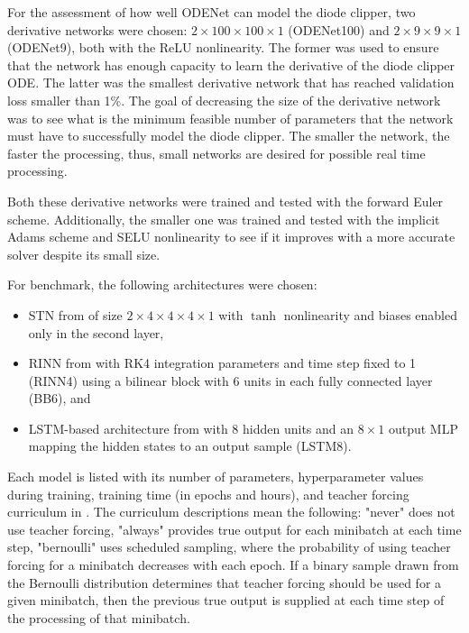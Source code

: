For the assessment of how well ODENet can model the diode clipper, two derivative networks were chosen: $2 \times 100 \times 100 \times 1$ (ODENet100) and $2 \times 9 \times 9 \times 1$ (ODENet9), both with the \ac{ReLU} nonlinearity. The former was used to ensure that the network has enough capacity to learn the derivative of the diode clipper \ac{ODE}. The latter was the smallest derivative network that has reached validation loss smaller than 1\%. The goal of decreasing the size of the derivative network was to see what is the minimum feasible number of parameters that the network must have to successfully model the diode clipper. The smaller the network, the faster the processing, thus, small networks are desired for possible real time processing.

Both these derivative networks were trained and tested with the forward Euler scheme. Additionally, the smaller one was trained and tested with the implicit Adams scheme and \ac{SELU} nonlinearity to see if it improves with a more accurate solver despite its small size.

For benchmark, the following architectures were chosen:
\begin{itemize}
    \item \ac{STN} from \cite{Parker2019} of size $2 \times 4 \times 4 \times 4 \times 1$ with $\tanh$ nonlinearity and biases enabled only in the second layer, 
    \item \ac{RINN} from \cite{Ouala2019} with \ac{RK}4 integration parameters and time step fixed to 1 (\ac{RINN}4) using a bilinear block with 6 units in each fully connected layer (BB6), and 
    \item \ac{LSTM}-based architecture from \cite{Wright2019} with 8 hidden units and an $8 \times 1$ output \ac{MLP} mapping the hidden states to an output sample (\ac{LSTM}8).
\end{itemize}

Each model is listed with its number of parameters,
hyperparameter values during training, training time (in epochs and hours), and teacher forcing curriculum in . The curriculum descriptions mean the following: "never" does not use teacher forcing, "always" provides true output for each minibatch at each time step, "bernoulli" uses scheduled sampling, where the probability of using teacher forcing for a minibatch decreases with each epoch. If a binary sample drawn from the Bernoulli distribution determines that teacher forcing should be used for a given minibatch, then the previous true output is supplied at each time step of the processing of that minibatch.

